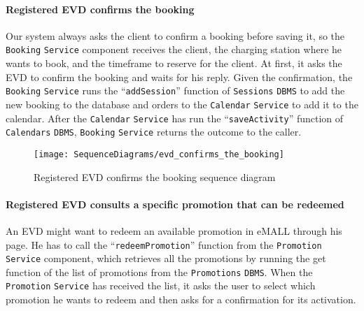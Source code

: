 \paragraph{\texorpdfstring{\protect\hypertarget{evdconfirmsbooking}{Registered EVD confirms the booking}}{}}
Our system always asks the client to confirm a booking before saving it, so the \verb|Booking| \verb|Service| component receives the client, the charging station where he wants to book, and the timeframe to reserve for the client.
At first, it asks the EVD to confirm the booking and waits for his reply.
Given the confirmation, the \verb|Booking| \verb|Service| runs the ``\verb|addSession|'' function of \verb|Sessions| \verb|DBMS| to add the new booking to the database and orders to the \verb|Calendar| \verb|Service| to add it to the calendar.
After the \verb|Calendar| \verb|Service| has run the ``\verb|saveActivity|'' function of \verb|Calendars| \verb|DBMS|, \verb|Booking| \verb|Service| returns the outcome to the caller.
\begin{figure}[H]
    \begin{center}
        \texttt{[image: SequenceDiagrams/evd\_confirms\_the\_booking]}
        \caption{Registered EVD confirms the booking sequence diagram}
        \label{fig:evd_confirms_booking}
    \end{center}
\end{figure}

\paragraph{Registered EVD consults a specific promotion that can be redeemed}
An EVD might want to redeem an available promotion in eMALL through his page.
He has to call the ``\verb|redeemPromotion|'' function from the \verb|Promotion| \verb|Service| component, which retrieves all the promotions by running the get function of the list of promotions from the \verb|Promotions| \verb|DBMS|\@.
When the \verb|Promotion| \verb|Service| has received the list, it asks the user to select which promotion he wants to redeem and then asks for a confirmation for its activation.

